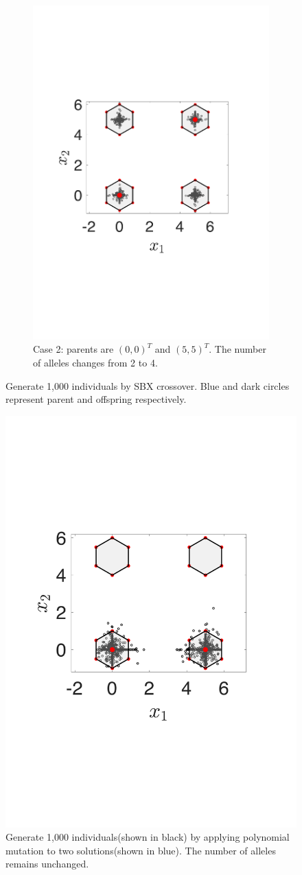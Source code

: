 \documentclass[conference]{IEEEtran}
\begin{document}
\begin{figure}[htbp]
\begin{subfigure}[b]{.24\textwidth}
		\includegraphics[width=\linewidth]{Section3/crossover2}
		\caption{Case 2: parents are $(0, 0)^T$ and $(5, 5)^T$. The number of alleles changes from 2 to 4.}
		\label{fig: SBX crossover case 2}
	\end{subfigure}
	\caption{Generate 1,000 individuals by SBX crossover. Blue and dark circles represent parent and offspring respectively.}
	\label{fig: SBX crossover}
\end{figure}

\begin{figure}[htbp]
    \centering
    \includegraphics[width=.24\textwidth]{Section3/mutation}
    \caption{Generate 1,000 individuals(shown in black) by applying polynomial mutation to two solutions(shown in blue). The number of alleles remains unchanged.}
    \label{fig: Polynomial mutation}
\end{figure}
\end{document}
